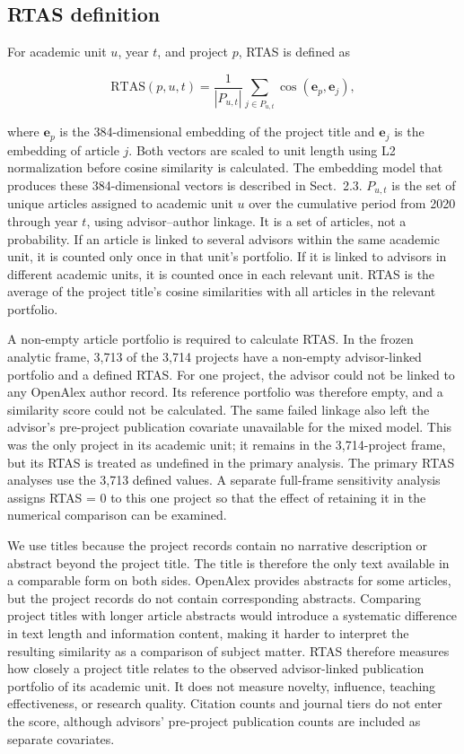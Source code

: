 \documentclass[pdflatex,sn-apa]{sn-jnl}
\begin{document}
\subsection{RTAS definition}

For academic unit $u$, year $t$, and project $p$, RTAS is defined as

\begin{equation}
\mathrm{RTAS}(p,u,t)=
\frac{1}{|P_{u,t}|}
\sum_{j\in P_{u,t}}
\cos(\mathbf e_p,\mathbf e_j),
\end{equation}

where $\mathbf e_p$ is the 384-dimensional embedding of the project title and $\mathbf e_j$ is the embedding of article $j$. Both vectors are scaled to unit length using L2 normalization before cosine similarity is calculated. The embedding model that produces these 384-dimensional vectors is described in Sect.~2.3. $P_{u,t}$ is the set of unique articles assigned to academic unit $u$ over the cumulative period from 2020 through year $t$, using advisor--author linkage. It is a set of articles, not a probability. If an article is linked to several advisors within the same academic unit, it is counted only once in that unit's portfolio. If it is linked to advisors in different academic units, it is counted once in each relevant unit. RTAS is the average of the project title's cosine similarities with all articles in the relevant portfolio.

A non-empty article portfolio is required to calculate RTAS. In the frozen analytic frame, 3,713 of the 3,714 projects have a non-empty advisor-linked portfolio and a defined RTAS. For one project, the advisor could not be linked to any OpenAlex author record. Its reference portfolio was therefore empty, and a similarity score could not be calculated. The same failed linkage also left the advisor's pre-project publication covariate unavailable for the mixed model. This was the only project in its academic unit; it remains in the 3,714-project frame, but its RTAS is treated as undefined in the primary analysis. The primary RTAS analyses use the 3,713 defined values. A separate full-frame sensitivity analysis assigns RTAS = 0 to this one project so that the effect of retaining it in the numerical comparison can be examined.

We use titles because the project records contain no narrative description or abstract beyond the project title. The title is therefore the only text available in a comparable form on both sides. OpenAlex provides abstracts for some articles, but the project records do not contain corresponding abstracts. Comparing project titles with longer article abstracts would introduce a systematic difference in text length and information content, making it harder to interpret the resulting similarity as a comparison of subject matter. RTAS therefore measures how closely a project title relates to the observed advisor-linked publication portfolio of its academic unit. It does not measure novelty, influence, teaching effectiveness, or research quality. Citation counts and journal tiers do not enter the score, although advisors' pre-project publication counts are included as separate covariates.
\end{document}
